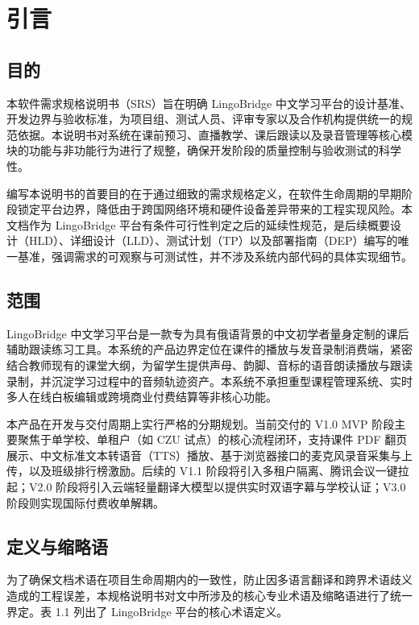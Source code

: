 \chapter{引言}

\section{目的}
本软件需求规格说明书（SRS）旨在明确 LingoBridge 中文学习平台的设计基准、开发边界与验收标准，为项目组、测试人员、评审专家以及合作机构提供统一的规范依据。本说明书对系统在课前预习、直播教学、课后跟读以及录音管理等核心模块的功能与非功能行为进行了规整，确保开发阶段的质量控制与验收测试的科学性。

编写本说明书的首要目的在于通过细致的需求规格定义，在软件生命周期的早期阶段锁定平台边界，降低由于跨国网络环境和硬件设备差异带来的工程实现风险。本文档作为 LingoBridge 平台有条件可行性判定之后的延续性规范，是后续概要设计（HLD）、详细设计（LLD）、测试计划（TP）以及部署指南（DEP）编写的唯一基准，强调需求的可观察与可测试性，并不涉及系统内部代码的具体实现细节。

\section{范围}
LingoBridge 中文学习平台是一款专为具有俄语背景的中文初学者量身定制的课后辅助跟读练习工具。本系统的产品边界定位在课件的播放与发音录制消费端，紧密结合教师现有的课堂大纲，为留学生提供声母、韵脚、音标的语音朗读播放与跟读录制，并沉淀学习过程中的音频轨迹资产。本系统不承担重型课程管理系统、实时多人在线白板编辑或跨境商业付费结算等非核心功能。

本产品在开发与交付周期上实行严格的分期规划。当前交付的 V1.0 MVP 阶段主要聚焦于单学校、单租户（如 CZU 试点）的核心流程闭环，支持课件 PDF 翻页展示、中文标准文本转语音（TTS）播放、基于浏览器接口的麦克风录音采集与上传，以及班级排行榜激励。后续的 V1.1 阶段将引入多租户隔离、腾讯会议一键拉起；V2.0 阶段将引入云端轻量翻译大模型以提供实时双语字幕与学校认证；V3.0 阶段则实现国际付费收单解耦。

\section{定义与缩略语}
为了确保文档术语在项目生命周期内的一致性，防止因多语言翻译和跨界术语歧义造成的工程误差，本规格说明书对文中所涉及的核心专业术语及缩略语进行了统一界定。表 1.1 列出了 LingoBridge 平台的核心术语定义。

